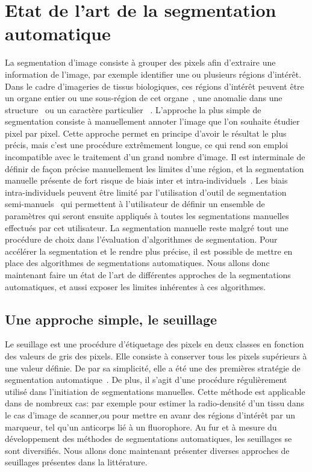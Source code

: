 \documentclass[\main/main.tex]{subfiles}
\begin{document}
            
\section{Etat de l'art de la segmentation automatique}

%
La segmentation d'image consiste à grouper des pixels afin d'extraire une information de l'image, par exemple identifier une ou plusieurs régions d'intérêt.
%
Dans le cadre d'imageries de tissus biologiques,
ces régions d'intérêt peuvent être un organe entier ou une sous\hyp{}région de cet organe~\cite{early_2018,liu_2020,gupta_2018},
une anomalie dans une structure~\cite{wadhwa_2019,huang_2019,ruikar_2019}
ou un caractère particulier~\cite{teixid_2019,hinfray_2018} .
%
L'approche la plus simple de segmentation consiste à manuellement annoter l'image que l'on souhaite étudier pixel par pixel.
%
Cette approche permet en principe d'avoir le résultat le plus précis,
mais c'est une procédure extrêmement longue, ce qui rend son emploi incompatible avec le traitement d'un grand nombre d'image.
%
Il est interminale de définir de façon précise manuellement les limites d'une région, et la segmentation manuelle présente de fort risque de biais inter et intra\hyp{}individuels~\cite{heye_2013}.
%
Les biais intra\hyp{}individuels peuvent être limité par l'utilisation d'outil de segmentation semi\hyp{}manuels~\cite{berg_2019,benenson_2019} qui permettent à l'utilisateur de définir un ensemble de paramètres qui seront ensuite appliqués à toutes les segmentations manuelles effectués par cet utilisateur.
%
La segmentation manuelle reste malgré tout une procédure de choix dans l'évaluation d'algorithmes de segmentation.
%
Pour accélérer la segmentation et le rendre plus précise, il est possible de mettre en place des algorithmes de segmentations automatiques.
%
Nous allons donc maintenant faire un état de l'art de différentes approches de la segmentations automatiques, et aussi exposer les limites inhérentes à ces algorithmes.

    \subsection{Une approche simple, le seuillage}
    
%
Le seuillage est une procédure d'étiquetage des pixels en deux classes en fonction des valeurs de gris des pixels. Elle consiste à conserver tous les pixels supérieurs à une valeur définie. De par sa simplicité, elle a été une des premières stratégie de segmentation automatique~\cite{sakai_1969,otsu_1979}.
%
De plus, il s'agit d'une procédure régulièrement utilisé dans l'initiation de segmentations manuelles.
%
Cette méthode est applicable dans de nombreux cas: par exemple pour estimer la radio\hyp{}densité d'un tissu dans le cas d'image de scanner,ou pour mettre en avanr des régions d'intérêt par un marqueur, tel qu'un anticorps lié à un fluorophore.
%
Au fur et à mesure du développement des méthodes de segmentations automatiques, les seuillages se sont diversifiés.
Nous allons donc maintenant présenter diverses approches de seuillages présentes dans la littérature.
\end{document}
